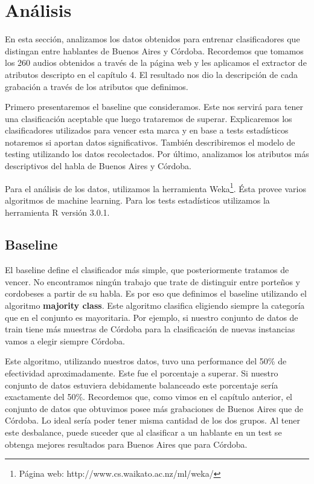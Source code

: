 \chapter{Análisis}

En esta sección, analizamos los datos obtenidos para entrenar clasificadores que distingan entre hablantes de Buenos Aires y Córdoba. Recordemos que tomamos los 260 audios obtenidos a través de la página web y les aplicamos el extractor de atributos descripto en el capítulo 4. El resultado nos dio la descripción de cada grabación a través de los atributos que definimos. 

Primero presentaremos el baseline que consideramos. Este nos servirá para tener una clasificación aceptable que luego trataremos de superar. Explicaremos los clasificadores utilizados para vencer esta marca y en base a tests estadísticos notaremos si aportan datos significativos. También describiremos el modelo de testing utilizando los datos recolectados. Por último, analizamos los atributos más descriptivos del habla de Buenos Aires y Córdoba. 

Para el análisis de los datos, utilizamos la herramienta Weka\footnote{Página web: http://www.cs.waikato.ac.nz/ml/weka/}. Ésta provee varios algoritmos de machine learning. Para los tests estadísticos utilizamos la herramienta R versión 3.0.1. 

\section{Baseline}

El baseline define el clasificador más simple, que posteriormente tratamos de vencer. No encontramos ningún trabajo que trate de distinguir entre porteños y cordobeses a partir de su habla. Es por eso que definimos el baseline utilizando el algoritmo \textbf{majority class}. Este algoritmo clasifica eligiendo siempre la categoría que en el conjunto es mayoritaria. Por ejemplo, si nuestro conjunto de datos de train tiene más muestras de Córdoba para la clasificación de nuevas instancias vamos a elegir siempre Córdoba.

Este algoritmo, utilizando nuestros datos, tuvo una performance del 50\% de efectividad aproximadamente. Este fue el porcentaje a superar. Si nuestro conjunto de datos estuviera debidamente balanceado este porcentaje sería exactamente del 50\%. Recordemos que, como vimos en el capítulo anterior, el conjunto de datos que obtuvimos posee más grabaciones de Buenos Aires que de Córdoba. Lo ideal sería poder tener misma cantidad de los dos grupos. Al tener este desbalance, puede suceder que al clasificar a un hablante en un test se obtenga mejores resultados para Buenos Aires que para Córdoba. 

